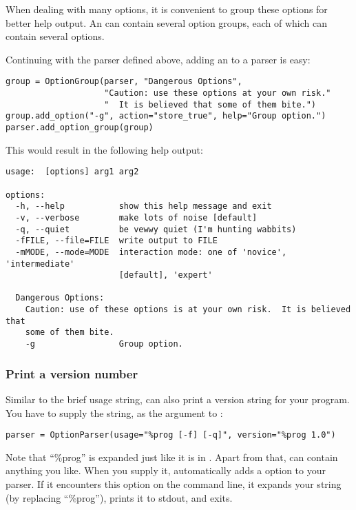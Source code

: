 When dealing with many options, it is convenient to group these
options for better help output.  An  can contain
several option groups, each of which can contain several options.

Continuing with the parser defined above, adding an
 to a parser is easy:

\begin{verbatim}
group = OptionGroup(parser, "Dangerous Options",
                    "Caution: use these options at your own risk."
                    "  It is believed that some of them bite.")
group.add_option("-g", action="store_true", help="Group option.")
parser.add_option_group(group)
\end{verbatim}

This would result in the following help output:

\begin{verbatim}
usage:  [options] arg1 arg2

options:
  -h, --help           show this help message and exit
  -v, --verbose        make lots of noise [default]
  -q, --quiet          be vewwy quiet (I'm hunting wabbits)
  -fFILE, --file=FILE  write output to FILE
  -mMODE, --mode=MODE  interaction mode: one of 'novice', 'intermediate'
                       [default], 'expert'

  Dangerous Options:
    Caution: use of these options is at your own risk.  It is believed that
    some of them bite.
    -g                 Group option.
\end{verbatim}


\subsubsection{Print a version number\label{optparse-print-version}}

Similar to the brief usage string,  can also print a
version string for your program.  You have to supply the string, as
the  argument to :

\begin{verbatim}
parser = OptionParser(usage="%prog [-f] [-q]", version="%prog 1.0")
\end{verbatim}

Note that ``\%prog'' is expanded just like it is in .  Apart from
that,  can contain anything you like.  When you supply it,
 automatically adds a  option to your
parser. If it encounters this option on the command line, it expands
your  string (by replacing ``\%prog''), prints it to
stdout, and exits.


